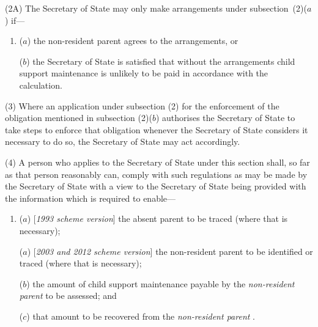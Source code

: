 \documentclass[12pt,a4paper]{article}
\begin{document}
(2A) The 
Secretary of State  %
may only make arrangements under subsection~(2)($a$) if—
\begin{enumerate}\item[]
($a$) the non-resident parent agrees to the arrangements, or

($b$) the 
Secretary of State  %
is satisfied that without the arrangements child support maintenance is unlikely to be paid in accordance with the calculation.
\end{enumerate}

(3) Where an application under subsection (2)  for the enforcement of the obligation mentioned in subsection (2)($b$)  authorises the 
Secretary of State  %
to take steps to enforce that obligation whenever 
the Secretary of State  %
considers it necessary to do so, the 
Secretary of State  %
may act accordingly.

(4) A person who applies to the 
Secretary of State  %
under this section shall, so far as that person reasonably can, comply with such regulations as may be made by the Secretary of State with a view to the 
Secretary of State  %
being provided with the information which is required to enable—
\begin{enumerate}\item[]
($a$) [\emph{1993 scheme version}] the absent parent to be traced (where that is necessary);

($a$) [\emph{2003 and 2012 scheme version}] the 
non-resident parent  %
to be 
identified or  %
traced (where that is necessary);

($b$) the amount of child support maintenance payable by the 
\emph{non-resident parent}  %
to be assessed; and

($c$) that amount to be recovered from the 
\emph{non-resident parent}%
.
\end{enumerate}
\end{document}
